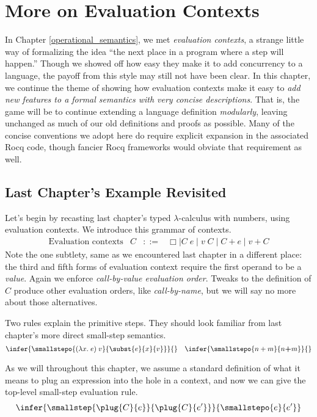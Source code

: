 \documentclass{amsbook}
\theoremstyle{definition}
\theoremstyle{remark}
\numberwithin{section}{chapter}
\numberwithin{equation}{chapter}
\begin{document}

\chapter{More on Evaluation Contexts}\label{ectx}

In Chapter \ref{operational_semantics}, we met \emph{evaluation contexts}, a strange little way of formalizing the idea ``the next place in a program where a step will happen.''
Though we showed off how easy they make it to add concurrency to a language, the payoff from this style may still not have been clear.
In this chapter, we continue the theme of showing how evaluation contexts make it easy to \emph{add new features to a formal semantics with very concise descriptions}.
That is, the game will be to continue extending a language definition \emph{modularly}, leaving unchanged as much of our old definitions and proofs as possible.
Many of the concise conventions we adopt here do require explicit expansion in the associated Rocq code, though fancier Rocq frameworks would obviate that requirement as well.

\section{Last Chapter's Example Revisited}

Let's begin by recasting last chapter's typed $\lambda$-calculus with numbers, using evaluation contexts.
We introduce this grammar of contexts.
$$\begin{array}{rrcl}
  \textrm{Evaluation contexts} & C &::=& \Box \mid C \; e \mid v \; C \mid C + e \mid v + C
\end{array}$$
Note the one subtlety, same as we encountered last chapter in a different place: the third and fifth forms of evaluation context require the first operand to be a \emph{value}.
Again we enforce \emph{call-by-value evaluation order}.
Tweaks to the definition of $C$ produce other evaluation orders, like \emph{call-by-name}, but we will say no more about those alternatives.

Two rules explain the primitive steps.
They should look familiar from last chapter's more direct small-step semantics.
$$\infer{\smallstepo{(\lambda x. \; e) \; v}{\subst{e}{x}{v}}}{}
\quad \infer{\smallstepo{n + m}{n \textbf{+} m}}{}$$

\encoding
As we will throughout this chapter, we assume a standard definition of what it means to plug an expression into the hole in a context, and now we can give the top-level small-step evaluation rule.
$$\infer{\smallstep{\plug{C}{e}}{\plug{C}{e'}}}{
  \smallstepo{e}{e'}
}$$
\end{document}
